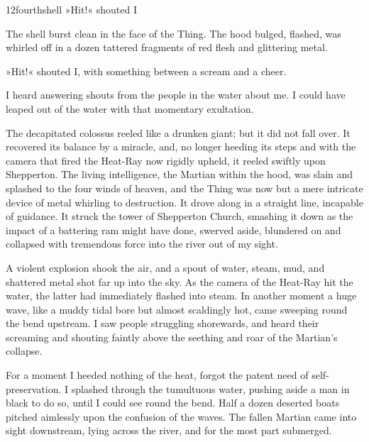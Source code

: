 
\begin{bwbigpic}
	[1.2] 
	{12fourthshell} 
	{»Hit!« shouted I} 
\end{bwbigpic}

The shell burst clean in the face of the Thing. The hood bulged, flashed, was whirled off in a dozen tattered fragments of red flesh and glittering metal.

»Hit!« shouted I, with something between a scream and a cheer.

I heard answering shouts from the people in the water about me. I could have leaped out of the water with that momentary exultation.

The decapitated colossus reeled like a drunken giant; but it did not fall over. It recovered its balance by a miracle, and, no longer heeding its steps and with the camera that fired the Heat-Ray now rigidly upheld, it reeled swiftly upon Shepperton. The living intelligence, the Martian within the hood, was slain and splashed to the four winds of heaven, and the Thing was now but a mere intricate device of metal whirling to destruction. It drove along in a straight line, incapable of guidance. It struck the tower of Shepperton Church, smashing it down as the impact of a battering ram might have done, swerved aside, blundered on and collapsed with tremendous force into the river out of my sight.

A violent explosion shook the air, and a spout of water, steam, mud, and shattered metal shot far up into the sky. As the camera of the Heat-Ray hit the water, the latter had immediately flashed into steam. In another moment a huge wave, like a muddy tidal bore but almost scaldingly hot, came sweeping round the bend upstream. I saw people struggling shorewards, and heard their screaming and shouting faintly above the seething and roar of the Martian's collapse.

For a moment I heeded nothing of the heat, forgot the patent need of self-preservation. I splashed through the tumultuous water, pushing aside a man in black to do so, until I could see round the bend. Half a dozen deserted boats pitched aimlessly upon the confusion of the waves. The fallen Martian came into sight downstream, lying across the river, and for the most part submerged.

